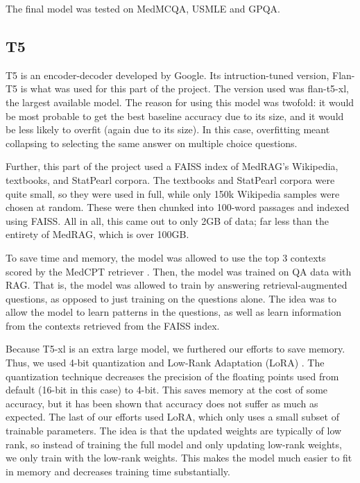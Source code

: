 \documentclass{article}
\begin{document}
The final model was tested on MedMCQA, USMLE and GPQA.

\subsection{T5}

T5 is an encoder-decoder developed by Google. Its intruction-tuned version, Flan-T5 \cite{chung2022scalinginstructionfinetunedlanguagemodels} is what was used for this part of the project. The version used was flan-t5-xl, the largest available model. The reason for using this model was twofold: it would be most probable to get the best baseline accuracy due to its size, and it would be less likely to overfit (again due to its size). In this case, overfitting meant collapsing to selecting the same answer on multiple choice questions.

Further, this part of the project used a FAISS \cite{douze2025faisslibrary} index of MedRAG's Wikipedia, textbooks, and StatPearl corpora. The textbooks and StatPearl corpora were quite small, so they were used in full, while only 150k Wikipedia samples were chosen at random. These were then chunked into 100-word passages and indexed using FAISS. All in all, this came out to only 2GB of data; far less than the entirety of MedRAG, which is over 100GB.

To save time and memory, the model was allowed to use the top 3 contexts scored by the MedCPT retriever \cite{Jin_2023}. Then, the model was trained on QA data with RAG. That is, the model was allowed to train by answering retrieval-augmented questions, as opposed to just training on the questions alone. The idea was to allow the model to learn patterns in the questions, as well as learn information from the contexts retrieved from the FAISS index.

Because T5-xl is an extra large model, we furthered our efforts to save memory. Thus, we used 4-bit quantization \cite{dettmers2023qloraefficientfinetuningquantized} and Low-Rank Adaptation (LoRA) \cite{hu2021loralowrankadaptationlarge}. The quantization technique decreases the precision of the floating points used from default (16-bit in this case) to 4-bit. This saves memory at the cost of some accuracy, but it has been shown that accuracy does not suffer as much as expected. The last of our efforts used LoRA, which only uses a small subset of trainable parameters. The idea is that the updated weights are typically of low rank, so instead of training the full model and only updating low-rank weights, we only train with the low-rank weights. This makes the model much easier to fit in memory and decreases training time substantially.
\end{document}
